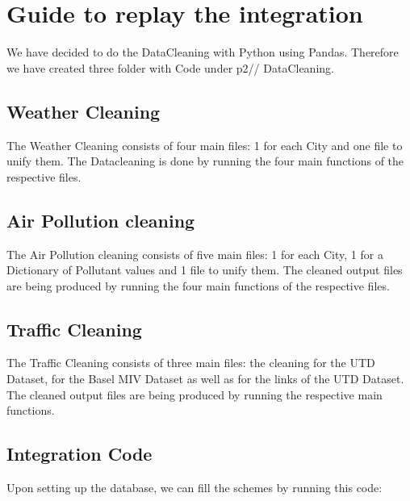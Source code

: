 \documentclass{article}
\begin{document}
\section{Guide to replay the integration}

We have decided to do the DataCleaning with Python using Pandas. Therefore we have created three folder with Code under p2// DataCleaning.

\subsection{Weather Cleaning}

The Weather Cleaning consists of four main files: 1 for each City and one file to unify them. The Datacleaning is done by running the four main functions of the respective files.

\subsection{Air Pollution cleaning}
The Air Pollution cleaning consists of five main files: 1 for each City, 1 for  a Dictionary of Pollutant values and 1 file to unify them. The cleaned output files are being produced by running the four main functions of the respective files.

\subsection{Traffic Cleaning}
The Traffic Cleaning consists of three main files: the cleaning for the UTD Dataset, for the Basel MIV Dataset as well as for the links of the UTD Dataset. The cleaned output files are being produced by running the respective main functions.

\subsection{Integration Code}
Upon setting up the database, we can fill the schemes by running this code:


\end{document}
